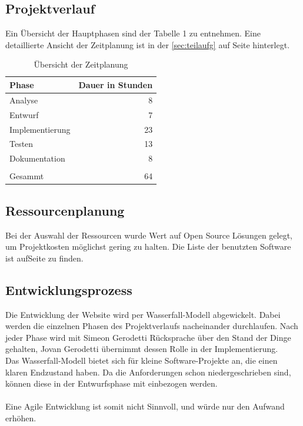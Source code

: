 \documentclass[11pt,a4paper]{article}
\begin{document}
\subsection{Projektverlauf}
Ein Übersicht der Hauptphasen sind der Tabelle 1 zu entnehmen. Eine detaillierte Ansicht der Zeitplanung ist in der \ref{sec:teilaufg} auf Seite \pageref{sec:teilaufg} hinterlegt.\\
\begin{table}[!ht]
  \centering
     \begin{tabular}{l|r}
       \textbf{Phase}  & \textbf{Dauer in Stunden} \\
       \hline
      Analyse       & 8                     \\
      Entwurf       & 7             	    \\
      Implementierung       & 23	\\
      Testen       & 13			         \\
       Dokumentation      &  8        \\
       \\
       \hline
       \hline
       Gesammt        & 64               \\
     \end{tabular}
     \caption{Übersicht der Zeitplanung}
\label{tbl:Übersicht der Zeitplanung}
\end{table}
\subsection{Ressourcenplanung}
Bei der Auswahl der Ressourcen wurde Wert auf Open Source Lösungen gelegt, um Projektkosten möglichst gering zu halten. Die Liste der benutzten Software ist aufSeite \pageref{sec:progs}
zu finden.
\subsection{Entwicklungsprozess}
Die Entwicklung der Website wird per Wasserfall-Modell abgewickelt. Dabei werden die einzelnen Phasen des Projektverlaufs nacheinander durchlaufen. Nach jeder Phase wird mit Simeon Gerodetti Rücksprache über den Stand der Dinge gehalten, Jovan Gerodetti übernimmt dessen Rolle in der Implementierung.\\
Das Wasserfall-Modell bietet sich für kleine Software-Projekte an, die einen klaren Endzustand haben. Da die Anforderungen schon niedergeschrieben sind, können diese in der Entwurfsphase mit einbezogen werden. \\\\
Eine Agile Entwicklung ist somit nicht Sinnvoll, und würde nur den Aufwand erhöhen.
\end{document}
